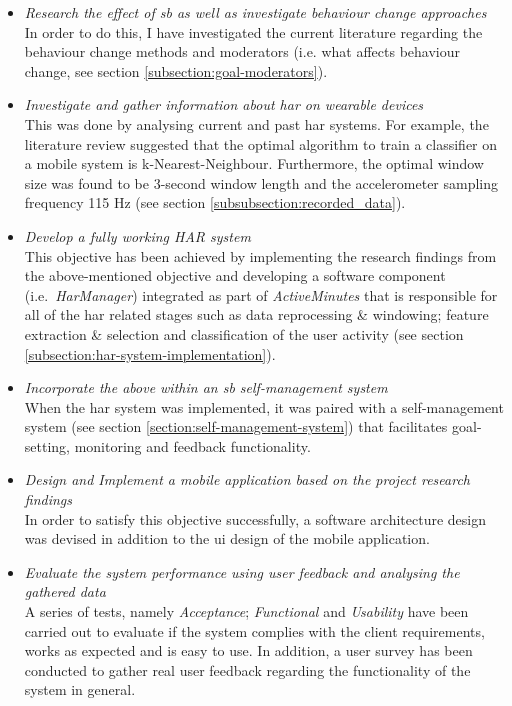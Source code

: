 \begin{itemize}
    \item \textit{Research the effect of \gls{sb} as well as investigate behaviour change approaches}\\
    In order to do this, I have investigated the current literature regarding the behaviour change methods and moderators (i.e. what affects behaviour change, see section \ref{subsection:goal-moderators}).
    \item \textit{Investigate and gather information about \gls{har} on wearable devices}\\
    This was done by analysing current and past \gls{har} systems. For example, the literature review suggested that the optimal algorithm to train a classifier on a mobile system is k-Nearest-Neighbour. Furthermore, the optimal window size was found to be 3-second window length and the accelerometer sampling frequency 115 Hz (see section \ref{subsubsection:recorded_data}).
    \item \textit{Develop a fully working HAR system}\\
    This objective has been achieved by implementing the research findings from the above-mentioned objective and developing a software component (i.e.\ \textit{HarManager}) integrated as part of \textit{ActiveMinutes} that is responsible for all of the \gls{har} related stages such as data reprocessing \& windowing; feature extraction \& selection and classification of the user activity (see section \ref{subsection:har-system-implementation}).
    
    \item \textit{Incorporate the above within an \gls{sb} self-management system}\\
    When the \gls{har} system was implemented, it was paired with a self-management system (see section \ref{section:self-management-system}) that facilitates goal-setting, monitoring and feedback functionality.
    \item \textit{Design and Implement a mobile application based on the project research findings}\\
    In order to satisfy this objective successfully, a software architecture design was devised in addition to the \gls{ui} design of the mobile application.
    
    \item \textit{Evaluate the system performance using user feedback and analysing the gathered data}\\
    A series of tests, namely \textit{Acceptance}; \textit{Functional} and \textit{Usability} have been carried out to evaluate if the system complies with the client requirements, works as expected and is easy to use. In addition, a user survey has been conducted to gather real user feedback regarding the functionality of the system in general.
    

\end{itemize}
